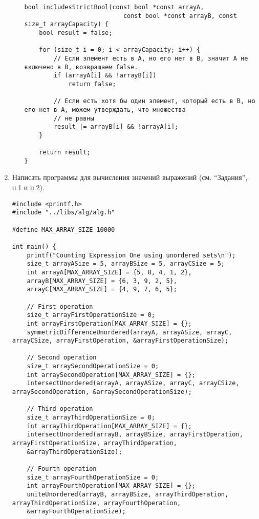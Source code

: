 \documentclass[a4paper,14pt]{extarticle}
\begin{document}
\begin{enumerate}[№1. ]
\begin{enumerate}[label=\asbuk*),ref=\asbuk*]
\begin{verbatim}
bool includesStrictBool(const bool *const arrayA,
                           const bool *const arrayB, const size_t arrayCapacity) {
    bool result = false;

    for (size_t i = 0; i < arrayCapacity; i++) {
        // Если элемент есть в A, но его нет в B, значит A не включено в B, возвращаем false.
        if (arrayA[i] && !arrayB[i])
            return false;

        // Если есть хотя бы один элемент, который есть в B, но его нет в A, можем утверждать, что множества
        // не равны
        result |= arrayB[i] && !arrayA[i];
    }

    return result;
}
			\end{verbatim}
		\end{enumerate}

		\item Написать программы для вычисления значений выражений (см. “Задания”, п.1 и п.2).
		\begin{verbatim}
#include <printf.h>
#include "../libs/alg/alg.h"

#define MAX_ARRAY_SIZE 10000

int main() {
	printf("Counting Expression One using unordered sets\n");
	size_t arrayASize = 5, arrayBSize = 5, arrayCSize = 5;
	int arrayA[MAX_ARRAY_SIZE] = {5, 8, 4, 1, 2},
	arrayB[MAX_ARRAY_SIZE] = {6, 3, 9, 2, 5},
	arrayC[MAX_ARRAY_SIZE] = {4, 9, 7, 6, 5};
	
	// First operation
	size_t arrayFirstOperationSize = 0;
	int arrayFirstOperation[MAX_ARRAY_SIZE] = {};
	symmetricDifferenceUnordered(arrayA, arrayASize, arrayC, arrayCSize, arrayFirstOperation, &arrayFirstOperationSize);
	
	// Second operation
	size_t arraySecondOperationSize = 0;
	int arraySecondOperation[MAX_ARRAY_SIZE] = {};
	intersectUnordered(arrayA, arrayASize, arrayC, arrayCSize, arraySecondOperation, &arraySecondOperationSize);
	
	// Third operation
	size_t arrayThirdOperationSize = 0;
	int arrayThirdOperation[MAX_ARRAY_SIZE] = {};
	intersectUnordered(arrayB, arrayBSize, arrayFirstOperation, arrayFirstOperationSize, arrayThirdOperation,
	&arrayThirdOperationSize);
	
	// Fourth operation
	size_t arrayFourthOperationSize = 0;
	int arrayFourthOperation[MAX_ARRAY_SIZE] = {};
	uniteUnordered(arrayB, arrayBSize, arrayThirdOperation, arrayThirdOperationSize, arrayFourthOperation,
	&arrayFourthOperationSize);
	

\end{verbatim}
\end{enumerate}
\end{document}
